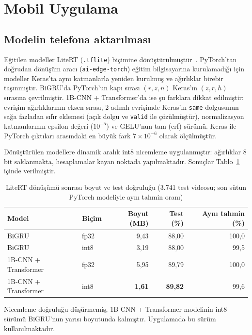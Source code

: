 \section{Mobil Uygulama}
\label{CH:Uygulama}

\subsection{Modelin telefona aktarılması}

Eğitilen modeller LiteRT (\texttt{.tflite}) biçimine dönüştürülmüştür~\cite{LiteRT}.
PyTorch'tan doğrudan dönüşüm aracı (\texttt{ai-edge-torch}) eğitim bilgisayarına
kurulamadığı için modeller Keras'ta aynı katmanlarla yeniden kurulmuş ve ağırlıklar
birebir taşınmıştır. BiGRU'da PyTorch'un kapı sırası $(r, z, n)$ Keras'ın $(z, r, h)$
sırasına çevrilmiştir. 1B-CNN + Transformer'da ise şu farklara dikkat edilmiştir:
evrişim ağırlıklarının eksen sırası, 2 adımlı evrişimde Keras'ın \texttt{same} dolgusunun
sağa fazladan sıfır eklemesi (açık dolgu ve \texttt{valid} ile çözülmüştür), normalizasyon
katmanlarının epsilon değeri ($10^{-5}$) ve GELU'nun tam (erf) sürümü. Keras ile PyTorch
çıktıları arasındaki en büyük fark $7\times10^{-6}$ olarak ölçülmüştür.

Dönüştürülen modellere dinamik aralık int8 nicemleme uygulanmıştır: ağırlıklar 8 bit
saklanmakta, hesaplamalar kayan noktada yapılmaktadır. Sonuçlar
Tablo~\ref{tab:donusum} içinde verilmiştir.

\begin{table}[H]
\centering
\caption{LiteRT dönüşümü sonrası boyut ve test doğruluğu (3.741 test videosu; son sütun PyTorch modeliyle aynı tahmin oranı)}
\label{tab:donusum}
\small
\begin{tabular}{@{}llrrr@{}}
\toprule
\textbf{Model} & \textbf{Biçim} & \textbf{Boyut (MB)} & \textbf{Test (\%)} & \textbf{Aynı tahmin (\%)} \\
\midrule
BiGRU & fp32 & 9,43 & 88,00 & 100,0 \\
BiGRU & int8 & 3,19 & 88,00 & 99,5 \\
1B-CNN + Transformer & fp32 & 5,95 & 89,79 & 100,0 \\
1B-CNN + Transformer & int8 & \textbf{1,61} & \textbf{89,82} & 99,6 \\
\bottomrule
\end{tabular}
\end{table}

Nicemleme doğruluğu düşürmemiş, 1B-CNN + Transformer modelinin int8 sürümü BiGRU'nun
yarısı boyutunda kalmıştır. Uygulamada bu sürüm kullanılmaktadır.

